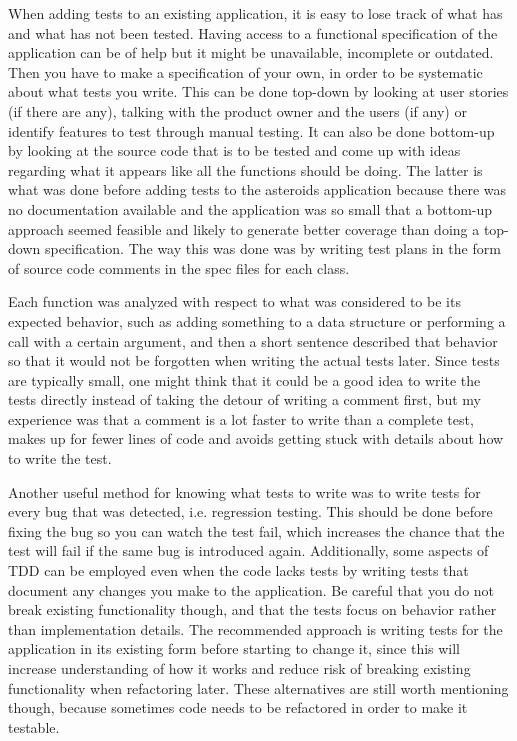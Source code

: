 \documentclass[11pt]{article}
\begin{document}
When adding tests to an existing application, it is easy to lose track of what has and what has not been tested. Having access to a functional specification of the application can be of help but it might be unavailable, incomplete or outdated. Then you have to make a specification of your own, in order to be systematic about what tests you write. This can be done top-down by looking at user stories (if there are any), talking with the product owner and the users (if any) or identify features to test through manual testing. It can also be done bottom-up by looking at the source code that is to be tested and come up with ideas regarding what it appears like all the functions should be doing. The latter is what was done before adding tests to the asteroids application because there was no documentation available and the application was so small that a bottom-up approach seemed feasible and likely to generate better coverage than doing a top-down specification. The way this was done was by writing test plans in the form of source code comments in the spec files for each class.

Each function was analyzed with respect to what was considered to be its expected behavior, such as adding something to a data structure or performing a call with a certain argument, and then a short sentence described that behavior so that it would not be forgotten when writing the actual tests later. Since tests are typically small, one might think that it could be a good idea to write the tests directly instead of taking the detour of writing a comment first, but my experience was that a comment is a lot faster to write than a complete test, makes up for fewer lines of code and avoids getting stuck with details about how to write the test.

Another useful method for knowing what tests to write was to write tests for every bug that was detected, i.e. regression testing. This should be done before fixing the bug so you can watch the test fail, which increases the chance that the test will fail if the same bug is introduced again. Additionally, some aspects of TDD can be employed even when the code lacks tests by writing tests that document any changes you make to the application. Be careful that you do not break existing functionality though, and that the tests focus on behavior rather than implementation details. The recommended approach is writing tests for the application in its existing form before starting to change it, since this will increase understanding of how it works and reduce risk of breaking existing functionality when refactoring later. These alternatives are still worth mentioning though, because sometimes code needs to be refactored in order to make it testable.
\end{document}
